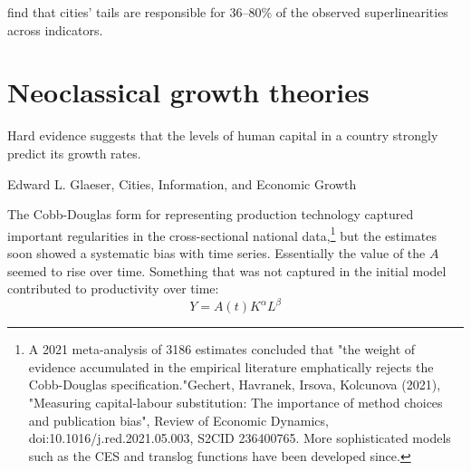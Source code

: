 

\cite{arvidssonUrbanScalingLaws2023} find that cities’ tails are responsible for 36–80\% of the observed superlinearities across indicators. 

\section{Neoclassical growth theories} 

\label{section-growth}
\epigraph{Hard evidence suggests that the levels of human capital in a country strongly predict its growth rates.}{Edward L. Glaeser, Cities, Information, and Economic Growth}


The \gls{Cobb-Douglas} form for representing production technology captured  important regularities in the cross-sectional national data,\footnote{ A 2021 meta-analysis of 3186 estimates concluded that "the weight of evidence accumulated in the empirical literature emphatically rejects the Cobb-Douglas specification."Gechert, Havranek, Irsova, Kolcunova (2021), "Measuring capital-labour substitution: The importance of method choices and publication bias", Review of Economic Dynamics, doi:10.1016/j.red.2021.05.003, S2CID 236400765. More sophisticated models  such as the CES and translog functions have been developed  since.} 
but the estimates soon showed a systematic bias with time series. Essentially the value of the $A$ seemed to rise over time. Something that was not captured in the initial model  contributed to productivity over time: 
 \[Y=A(t)K^\alpha L^\beta\]


